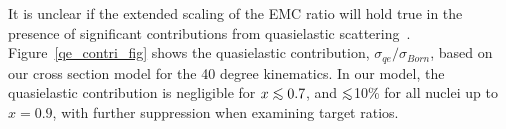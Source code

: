 It is unclear if the extended scaling of the EMC ratio will hold true in the
presence of significant contributions from quasielastic
scattering~\cite{melnitchouk:2005zr, niculescu06, Osipenko:2010sb}. 
Figure~\ref{qe_contri_fig} shows the quasielastic contribution,
$\sigma_{qe}/\sigma_{Born}$, based on our cross section model for the 40
degree kinematics.  In our model, the quasielastic contribution is negligible
for $x \ltorder 0.7$, and $\ltorder$10\% for all nuclei up to $x=0.9$, with
further suppression when examining target ratios. 

